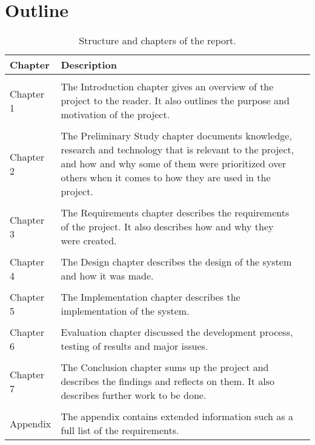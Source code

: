 \section{Outline}
\begin{table}[H]
  \centering
  \begin{tabularx}{\textwidth}{ l X l }
    \textbf{Chapter}      & \textbf{Description} \\
    \hline \\ [-1.5ex]
    Chapter 1 & The Introduction chapter gives an overview of the project to the reader. It also outlines the purpose and motivation of the project. \\
    \hline \\ [-1.5ex]
    Chapter 2 & The Preliminary Study chapter documents knowledge, research and technology that is relevant to the project, and how and why some of them were prioritized over others when it comes to how they are used in the project. \\
    \hline \\ [-1.5ex]
    Chapter 3 & The Requirements chapter describes the requirements of the project. It also describes how and why they were created. \\
    \hline \\ [-1.5ex]
    Chapter 4 & The Design chapter describes the design of the system and how it was made. \\
    \hline \\ [-1.5ex]
    Chapter 5 & The Implementation chapter describes the implementation of the system. \\
    \hline \\ [-1.5ex]
    Chapter 6 & Evaluation chapter discussed the development process, testing of results and major issues. \\
    \hline \\ [-1.5ex]
    Chapter 7 & The Conclusion chapter sums up the project and describes the findings and reflects on them. It also describes further work to be done. \\
    \hline \\ [-1.5ex]
    Appendix & The appendix contains extended information such as a full list of the requirements. \\
  \end{tabularx}
  \caption{Structure and chapters of the report.}
  \label{table-reportstructure}
\end{table}
